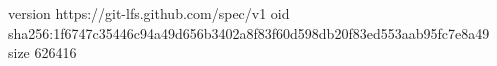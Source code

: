 version https://git-lfs.github.com/spec/v1
oid sha256:1f6747c35446c94a49d656b3402a8f83f60d598db20f83ed553aab95fc7e8a49
size 626416
